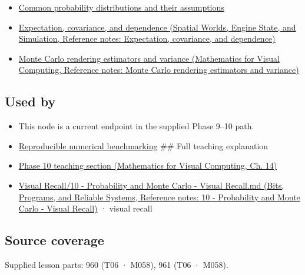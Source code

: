 \begin{itemize}
\tightlist
\item
  \hyperref[appendix-a2360b435383]{Common probability distributions and their assumptions}
\item
  \href{../05-Spatial-Worlds-Engine-State-and-Simulation/main.pdf\#nameddest=appendix-54c383df9992}{Expectation, covariance, and dependence (Spatial Worlds, Engine State, and Simulation, Reference notes: Expectation, covariance, and dependence)}
\item
  \href{../02-Mathematics-for-Visual-Computing/main.pdf\#nameddest=appendix-031e02bf28af}{Monte Carlo rendering estimators and variance (Mathematics for Visual Computing, Reference notes: Monte Carlo rendering estimators and variance)}
\end{itemize}

\subsection{Used by}\label{appendix-c83016554b1e-used-by}

\hypertarget{appendix-c83016554b1e-used-by}{}

\begin{itemize}
\item
  This node is a current endpoint in the supplied Phase 9--10 path.
\item
  \hyperref[appendix-b9db93e28371]{Reproducible numerical benchmarking} \#\# Full teaching explanation
\item
  \href{../02-Mathematics-for-Visual-Computing/main.pdf\#nameddest=02-foundations-ii-ch030-inference-and-error-metrics-need-explicit-assumptions}{Phase 10 teaching section (Mathematics for Visual Computing, Ch. 14)}
\item
  \href{../01-Bits-Programs-and-Reliable-Systems/main.pdf\#nameddest=appendix-cb5af353ef77}{Visual Recall/10 - Probability and Monte Carlo - Visual Recall.md (Bits, Programs, and Reliable Systems, Reference notes: 10 - Probability and Monte Carlo - Visual Recall)} · visual recall
\end{itemize}

\subsection{Source coverage}\label{appendix-c83016554b1e-source-coverage}

\hypertarget{appendix-c83016554b1e-source-coverage}{}

Supplied lesson parts: 960 (T06 · M058), 961 (T06 · M058).
